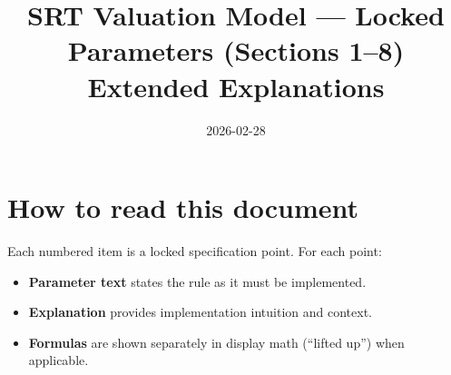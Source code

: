 \documentclass[11pt]{article}
\title{SRT Valuation Model — Locked Parameters (Sections 1--8)\\Extended Explanations}
\date{2026-02-28}
\begin{document}
\maketitle

\section*{How to read this document}
Each numbered item is a locked specification point. For each point:
\begin{itemize}
  \item \textbf{Parameter text} states the rule as it must be implemented.
  \item \textbf{Explanation} provides implementation intuition and context.
  \item \textbf{Formulas} are shown separately in display math (``lifted up'') when applicable.
\end{itemize}
\end{document}
